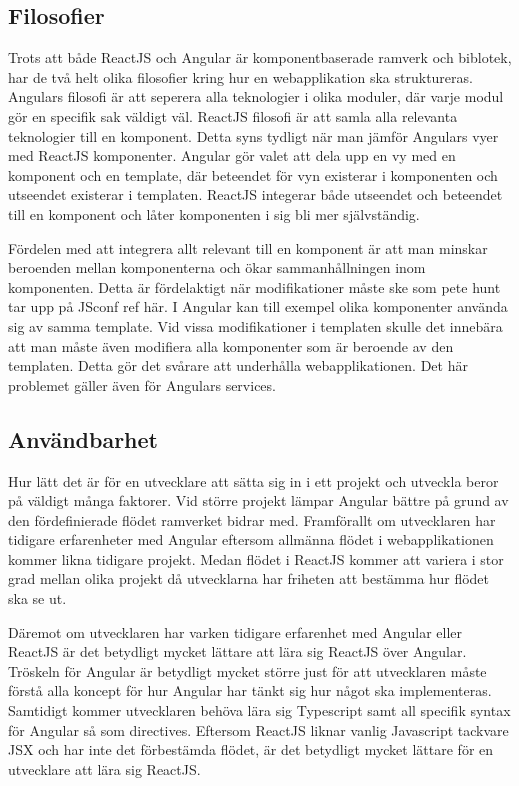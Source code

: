 \subsection{Filosofier}
Trots att både ReactJS och Angular är komponentbaserade ramverk och biblotek, har de två helt olika filosofier kring hur en webapplikation ska struktureras. Angulars filosofi är att seperera alla teknologier i olika moduler, där varje modul gör en specifik sak väldigt väl. ReactJS filosofi är att samla alla relevanta teknologier till en komponent. Detta syns tydligt när man jämför Angulars vyer med ReactJS komponenter. Angular gör valet att dela upp en vy med en komponent och en template, där beteendet för vyn existerar i komponenten och utseendet existerar i templaten. ReactJS integerar både utseendet och beteendet till en komponent och låter komponenten i sig bli mer självständig. 

Fördelen med att integrera allt relevant till en komponent är att man minskar beroenden mellan komponenterna och ökar sammanhållningen inom komponenten. Detta är fördelaktigt när modifikationer måste ske som pete hunt tar upp på JSconf ref här. I Angular kan till exempel olika komponenter använda sig av samma template. Vid vissa modifikationer i templaten skulle det innebära att man måste även modifiera alla komponenter som är beroende av den templaten. Detta gör det svårare att underhålla webapplikationen. Det här problemet gäller även för Angulars services.


\subsection{Användbarhet}
Hur lätt det är för en utvecklare att sätta sig in i ett projekt och utveckla beror på väldigt många faktorer. Vid större projekt lämpar Angular bättre på grund av den fördefinierade flödet ramverket bidrar med. Framförallt om utvecklaren har tidigare erfarenheter med Angular eftersom allmänna flödet i webapplikationen kommer likna tidigare projekt. Medan flödet i ReactJS kommer att variera i stor grad mellan olika projekt då utvecklarna har friheten att bestämma hur flödet ska se ut. 

Däremot om utvecklaren har varken tidigare erfarenhet med Angular eller ReactJS är det betydligt mycket lättare att lära sig ReactJS över Angular. Tröskeln för Angular är betydligt mycket större just för att utvecklaren måste förstå alla koncept för hur Angular har tänkt sig hur något ska implementeras. Samtidigt kommer utvecklaren behöva lära sig Typescript samt all specifik syntax för Angular så som directives. Eftersom ReactJS liknar vanlig Javascript tackvare JSX och har inte det förbestämda flödet, är det betydligt mycket lättare för en utvecklare att lära sig ReactJS.

